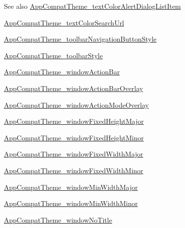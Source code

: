 \begin{DoxySeeAlso}{See also}
\hyperlink{classandroid_1_1support_1_1v4_1_1R_1_1styleable_a635d1d4e8c44021e9a86c648aa1353ac}{App\+Compat\+Theme\+\_\+text\+Color\+Alert\+Dialog\+List\+Item} 

\hyperlink{classandroid_1_1support_1_1v4_1_1R_1_1styleable_af247dbb00ad2d383e2bbe1ed27fd7304}{App\+Compat\+Theme\+\_\+text\+Color\+Search\+Url} 

\hyperlink{classandroid_1_1support_1_1v4_1_1R_1_1styleable_aa8e0c46e553d29574374131334849630}{App\+Compat\+Theme\+\_\+toolbar\+Navigation\+Button\+Style} 

\hyperlink{classandroid_1_1support_1_1v4_1_1R_1_1styleable_add96349c4e4f3a9c0e641cbdfe385992}{App\+Compat\+Theme\+\_\+toolbar\+Style} 

\hyperlink{classandroid_1_1support_1_1v4_1_1R_1_1styleable_a13120c866ad32e1b4339a93a131463d6}{App\+Compat\+Theme\+\_\+window\+Action\+Bar} 

\hyperlink{classandroid_1_1support_1_1v4_1_1R_1_1styleable_a35dd6a281168ca4263f3a47afa038b5a}{App\+Compat\+Theme\+\_\+window\+Action\+Bar\+Overlay} 

\hyperlink{classandroid_1_1support_1_1v4_1_1R_1_1styleable_a90589f30809f60bc8783dde73bb5e9f1}{App\+Compat\+Theme\+\_\+window\+Action\+Mode\+Overlay} 

\hyperlink{classandroid_1_1support_1_1v4_1_1R_1_1styleable_aaa685f805f4181374a8047b1ce8935b5}{App\+Compat\+Theme\+\_\+window\+Fixed\+Height\+Major} 

\hyperlink{classandroid_1_1support_1_1v4_1_1R_1_1styleable_a8406ab28fcb798abe69bcc846a2e8a7d}{App\+Compat\+Theme\+\_\+window\+Fixed\+Height\+Minor} 

\hyperlink{classandroid_1_1support_1_1v4_1_1R_1_1styleable_aeb98c393e76d842baf26189afd20c945}{App\+Compat\+Theme\+\_\+window\+Fixed\+Width\+Major} 

\hyperlink{classandroid_1_1support_1_1v4_1_1R_1_1styleable_af5b499ea473560087fcc1a5241132837}{App\+Compat\+Theme\+\_\+window\+Fixed\+Width\+Minor} 

\hyperlink{classandroid_1_1support_1_1v4_1_1R_1_1styleable_a5645adca1e8252ffeb1dc1c1480693b1}{App\+Compat\+Theme\+\_\+window\+Min\+Width\+Major} 

\hyperlink{classandroid_1_1support_1_1v4_1_1R_1_1styleable_a49209af19fab1feaef6b49e695bf15d0}{App\+Compat\+Theme\+\_\+window\+Min\+Width\+Minor} 

\hyperlink{classandroid_1_1support_1_1v4_1_1R_1_1styleable_a2434c4c955064f1b931a1059e587e1bb}{App\+Compat\+Theme\+\_\+window\+No\+Title} 
\end{DoxySeeAlso}
\mbox{\label{classandroid_1_1support_1_1v4_1_1R_1_1styleable_a0732bf3940b6c83753703acb180467fb}} 
